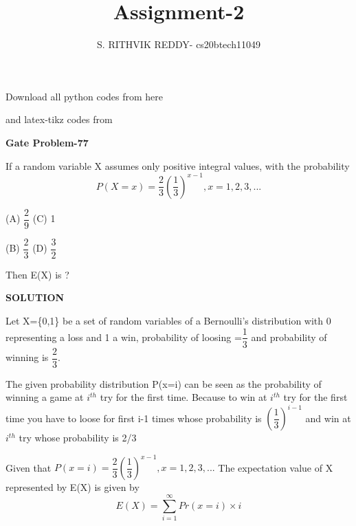\documentclass[a4paper]{article}
\title{Assignment-2}
\author{S. RITHVIK REDDY- cs20btech11049}
\date{}
\begin{document}
\maketitle
\noindent
Download all python codes from here

\begin{multicols*}{2}
\noindent
{}
    
\vspace{0.3cm}
and latex-tikz codes from  

\vspace{0.3cm}  
    
   
\vspace{0.5cm}
\textbf{Gate Problem-77}
\vspace{0.5cm}

If a random variable X assumes only positive integral values, with the probability 
$$P(X=x)=\dfrac{2}{3}\left(\dfrac{1}{3}\right)^{x-1} , x=1,2,3,...$$

(A) $\dfrac{2}{9}$ \hspace{2 cm} (C) 1

\vspace{0.5 cm}
(B) $\dfrac{2}{3}$ \hspace{2 cm} (D) $\dfrac{3}{2}$

Then E(X) is ?

\vspace{0.5cm}
\textbf{SOLUTION}
\vspace{0.5cm}

Let X=\{0,1\} be a set of random variables of a Bernoulli's distribution with 0 representing a loss and 1 a win, probability of loosing =$\dfrac{1}{3}$ and probability of winning is $\dfrac{2}{3}$.

The given probability distribution P(x=i) can be seen as the probability of winning a game at $i^{th}$ try for the first time. Because to win at  $i^{th}$ try for the first time you have to loose for first i-1 times whose probability is $\left(\dfrac{1}{3}\right)^{i-1}$ and win at $i^{th}$ try whose probability is 2/3

Given that $P(x=i)=\dfrac{2}{3}\left(\dfrac{1}{3}\right)^{x-1} , x=1,2,3,...$
The expectation value of X represented by E(X) is given by
$$E(X)=\sum_{i=1}^{\infty} Pr(x=i)\times i$$


\end{multicols*}
\end{document}
